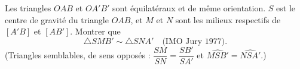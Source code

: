 Les triangles $OAB$ et $OA'B'$ sont équilatéraux et de même orientation.
$S$ est le centre de gravité du triangle $OAB$, et $M$ et $N$ sont
les milieux respectifs de $[A'B]$ et $[AB']$. Montrer que
\[
\triangle SMB' \sim \triangle SNA' \quad \text{(IMO Jury 1977)}.
\]
(Triangles semblables, de sens opposés : $\dfrac{SM}{SN}=\dfrac{SB'}{SA'}$
et $\widehat{MSB'}=\widehat{NSA'}$.)
